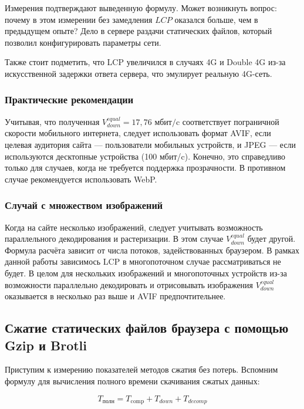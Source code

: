 \documentclass[12pt]{article}
\begin{document}
Измерения подтверждают выведенную формулу. Может возникнуть вопрос: почему в этом измерении без замедления $LCP$ оказался больше, чем в предыдущем опыте?
Дело в сервере раздачи статических файлов, который позволил конфигурировать параметры сети.

Также стоит подметить, что LCP увеличился в случаях 4G и Double 4G из-за искусственной задержки ответа сервера,
что эмулирует реальную 4G-сеть.

\subsubsection{Практические рекомендации}

Учитывая, что полученная $V^{equal}_{down} = 17{,}76 \text{ мбит/c}$ соответствует пограничной скорости мобильного интернета,
следует использовать формат AVIF, если целевая аудитория сайта — пользователи мобильных устройств,
и JPEG — если используются десктопные устройства (100 мбит/c). Конечно, это справедливо только для случаев,
когда не требуется поддержка прозрачности. В противном случае рекомендуется использовать WebP.

\subsubsection{Случай с множеством изображений}

Когда на сайте несколько изображений, следует учитывать возможность параллельного декодирования и растеризации.
В этом случае $V^{equal}_{down}$ будет другой. Формула расчёта зависит от числа потоков, задействованных браузером.
В рамках данной работы зависимось LCP в многопоточном случае рассматриваться не будет.
В целом для нескольких изображений и многопоточных устройств из-за возможности параллельно декодировать
и отрисовывать изображения $V^{equal}_{down}$ оказывается в несколько раз выше и AVIF предпочтительнее.

\subsection{Сжатие статических файлов браузера с помощью Gzip и Brotli}

Приступим к измерению показателей методов сжатия без потерь.
Вспомним формулу для вычисления полного времени скачивания сжатых данных:

\begin{equation}
    T_{\text{полн}} = T_{\text{comp}} + T_{down} + T_{decomp}
\end{equation}
\end{document}
